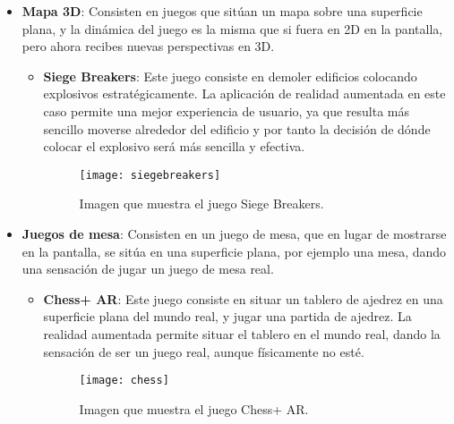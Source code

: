\begin{itemize}
  \item \textbf{Mapa 3D}: Consisten en juegos que sitúan un mapa sobre una superficie plana, y la dinámica del juego es la misma que si fuera en 2D en la pantalla, pero ahora recibes nuevas perspectivas en 3D.

  \begin{itemize}
    \item \textbf{Siege Breakers}: Este juego consiste en demoler edificios colocando explosivos estratégicamente. La aplicación de realidad aumentada en este caso permite una mejor experiencia de usuario, ya que resulta más sencillo moverse alrededor del edificio y por tanto la decisión de dónde colocar el explosivo será más sencilla y efectiva.

    \begin{figure}[h]
      \centering
      \texttt{[image: siegebreakers]}
      \caption{Imagen que muestra el juego Siege Breakers.\protect\footnotemark}
      \label{figura-siege-breakers}
    \end{figure}

  \end{itemize}


  \item \textbf{Juegos de mesa}: Consisten en un juego de mesa, que en lugar de mostrarse en la pantalla, se sitúa en una superficie plana, por ejemplo una mesa, dando una sensación de jugar un juego de mesa real.

  \begin{itemize}
    \item \textbf{Chess+ AR}: Este juego consiste en situar un tablero de ajedrez en una superficie plana del mundo real, y jugar una partida de ajedrez. La realidad aumentada permite situar el tablero en el mundo real, dando la sensación de ser un juego real, aunque físicamente no esté.

    \begin{figure}[h]
      \centering
      \texttt{[image: chess]}
      \caption{Imagen que muestra el juego Chess+ AR.\protect\footnotemark}
      \label{figura-siege-breakers}
    \end{figure}

  \end{itemize}

  \newpage


\end{itemize}
